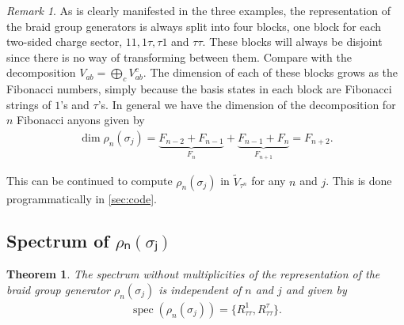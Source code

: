 \documentclass[a4paper,10pt,oneside]{book}
\theoremstyle{plain}
\newtheorem{theorem}{Theorem}[section]
\theoremstyle{definition}
\theoremstyle{remark}
\newtheorem{remark}{Remark}[section]
\begin{document}
\begin{remark}\label{remark:fibonacci sigma dimension}
  As is clearly manifested in the three examples, the representation of the braid group generators is always split into four blocks, one block for each two-sided charge sector, $11, 1τ, τ1$ and $ττ$. These blocks will always be disjoint since there is no way of transforming between them. Compare with the decomposition $V_{ab} = \bigoplus_c V_{ab}^c$. The dimension of each of these blocks grows as the Fibonacci numbers, simply because the basis states in each block are Fibonacci strings of $1$'s and $τ$'s. In general we have the dimension of the decomposition for $n$ Fibonacci anyons given by
  \begin{align*}
    \operatorname{dim} ρ_n (σ_j) = \underbrace{F_{n-2} + F_{n-1}}_{F_{n}} + \underbrace{F_{n-1} + F_{n}}_{F_{n+1}} = F_{n+2}.
  \end{align*}
\end{remark}

This can be continued to compute $ρ_n(σ_j)$ in $\widetilde{V}_{τ^n}$ for any $n$ and $j$. This is done programmatically in \cref{sec:code}.










\subsection{Spectrum of $ρₙ(σⱼ)$}

\begin{theorem}
  The spectrum without multiplicities of the representation of the braid group generator $ρ_n(σ_j)$ is independent of $n$ and $j$ and given by
  \begin{align*}
    \operatorname{spec}(ρ_n(σ_j)) = \big\{ R_{\tau\tau}^1, R_{\tau\tau}^\tau \big\}.
  \end{align*}
\end{theorem}
\end{document}
